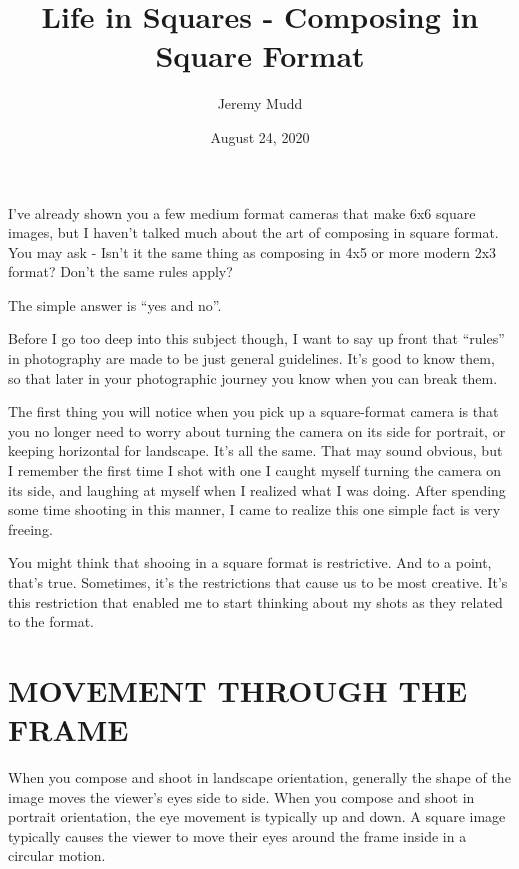 \documentclass[a4paper]{article}
\title{Life in Squares - Composing in Square Format}
\date{August 24, 2020}
\author{Jeremy Mudd}
\begin{document}
\maketitle


I’ve already shown you a few medium format cameras that make 6x6 square images, but I haven’t talked much about the art of composing in square format. You may ask - Isn’t it the same thing as composing in 4x5 or more modern 2x3 format? Don’t the same rules apply?  

The simple answer is “yes and no”.  

Before I go too deep into this subject though, I want to say up front that “rules” in photography are made to be just general guidelines. It’s good to know them, so that later in your photographic journey you know when you can break them.    

The first thing you will notice when you pick up a square-format camera is that you no longer need to worry about turning the camera on its side for portrait, or keeping horizontal for landscape. It’s all the same. That may sound obvious, but I remember the first time I shot with one I caught myself turning the camera on its side, and laughing at myself when I realized what I was doing. After spending some time shooting in this manner, I came to realize this one simple fact is very freeing. 

You might think that shooing in a square format is restrictive. And to a point, that’s true. Sometimes, it’s the restrictions that cause us to be most creative. It’s this restriction that enabled me to start thinking about my shots as they related to the format.

\section*{MOVEMENT THROUGH THE FRAME}
When you compose and shoot in landscape orientation, generally the shape of the image moves the viewer’s eyes side to side. When you compose and shoot in portrait orientation, the eye movement is typically up and down. A square image typically causes the viewer to move their eyes around the frame inside in a circular motion. 
\end{document}
